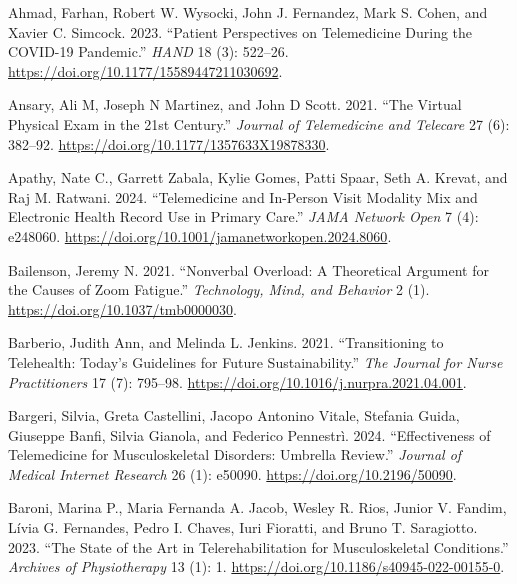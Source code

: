 \documentclass[
  letterpaper,
]{article}
\newlength{\cslhangindent}
\newenvironment{CSLReferences}[2] %
 {\begin{list}{}{%
  \setlength{\itemindent}{0pt}
  \setlength{\leftmargin}{0pt}
  \setlength{\parsep}{0pt}
  \ifodd #1
   \setlength{\leftmargin}{\cslhangindent}
   \setlength{\itemindent}{-1\cslhangindent}
  \fi
  \setlength{\itemsep}{#2\baselineskip}}}
 {\end{list}}
\begin{document}
\label{refs}
\begin{CSLReferences}{1}{0}
Ahmad, Farhan, Robert W. Wysocki, John J. Fernandez, Mark S. Cohen, and
Xavier C. Simcock. 2023. {``Patient {Perspectives} on {Telemedicine
During} the {COVID-19 Pandemic}.''} \emph{HAND} 18 (3): 522--26.
\url{https://doi.org/10.1177/15589447211030692}.

Ansary, Ali M, Joseph N Martinez, and John D Scott. 2021. {``The Virtual
Physical Exam in the 21st Century.''} \emph{Journal of Telemedicine and
Telecare} 27 (6): 382--92.
\url{https://doi.org/10.1177/1357633X19878330}.

Apathy, Nate C., Garrett Zabala, Kylie Gomes, Patti Spaar, Seth A.
Krevat, and Raj M. Ratwani. 2024. {``Telemedicine and {In-Person Visit
Modality Mix} and {Electronic Health Record Use} in {Primary Care}.''}
\emph{JAMA Network Open} 7 (4): e248060.
\url{https://doi.org/10.1001/jamanetworkopen.2024.8060}.

Bailenson, Jeremy N. 2021. {``Nonverbal Overload: {A} Theoretical
Argument for the Causes of Zoom Fatigue.''} \emph{Technology, Mind, and
Behavior} 2 (1). \url{https://doi.org/10.1037/tmb0000030}.

Barberio, Judith Ann, and Melinda L. Jenkins. 2021. {``Transitioning to
{Telehealth}: {Today}'s {Guidelines} for {Future Sustainability}.''}
\emph{The Journal for Nurse Practitioners} 17 (7): 795--98.
\url{https://doi.org/10.1016/j.nurpra.2021.04.001}.

Bargeri, Silvia, Greta Castellini, Jacopo Antonino Vitale, Stefania
Guida, Giuseppe Banfi, Silvia Gianola, and Federico Pennestrì. 2024.
{``Effectiveness of {Telemedicine} for {Musculoskeletal Disorders}:
{Umbrella Review}.''} \emph{Journal of Medical Internet Research} 26
(1): e50090. \url{https://doi.org/10.2196/50090}.

Baroni, Marina P., Maria Fernanda A. Jacob, Wesley R. Rios, Junior V.
Fandim, Lívia G. Fernandes, Pedro I. Chaves, Iuri Fioratti, and Bruno T.
Saragiotto. 2023. {``The State of the Art in Telerehabilitation for
Musculoskeletal Conditions.''} \emph{Archives of Physiotherapy} 13 (1):
1. \url{https://doi.org/10.1186/s40945-022-00155-0}.


\end{CSLReferences}
\end{document}
